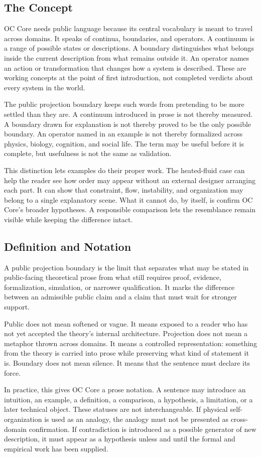 \documentclass[11pt,a4paper,openany]{book}
\begin{document}
\subsection{The Concept}
OC Core needs public language because its central vocabulary is meant to travel across domains. It speaks of continua, boundaries, and operators. A continuum is a range of possible states or descriptions. A boundary distinguishes what belongs inside the current description from what remains outside it. An operator names an action or transformation that changes how a system is described. These are working concepts at the point of first introduction, not completed verdicts about every system in the world. \cite{landau_stat_physics,prigogine_dissipative}\par
The public projection boundary keeps such words from pretending to be more settled than they are. A continuum introduced in prose is not thereby measured. A boundary drawn for explanation is not thereby proved to be the only possible boundary. An operator named in an example is not thereby formalized across physics, biology, cognition, and social life. The term may be useful before it is complete, but usefulness is not the same as validation.\par
This distinction lets examples do their proper work. The heated-fluid case can help the reader see how order may appear without an external designer arranging each part. It can show that constraint, flow, instability, and organization may belong to a single explanatory scene. What it cannot do, by itself, is confirm OC Core's broader hypotheses. A responsible comparison lets the resemblance remain visible while keeping the difference intact.\par
\subsection{Definition and Notation}
A public projection boundary is the limit that separates what may be stated in public-facing theoretical prose from what still requires proof, evidence, formalization, simulation, or narrower qualification. It marks the difference between an admissible public claim and a claim that must wait for stronger support. \cite{landau_stat_physics,prigogine_dissipative}\par
Public does not mean softened or vague. It means exposed to a reader who has not yet accepted the theory's internal architecture. Projection does not mean a metaphor thrown across domains. It means a controlled representation: something from the theory is carried into prose while preserving what kind of statement it is. Boundary does not mean silence. It means that the sentence must declare its force.\par
In practice, this gives OC Core a prose notation. A sentence may introduce an intuition, an example, a definition, a comparison, a hypothesis, a limitation, or a later technical object. These statuses are not interchangeable. If physical self-organization is used as an analogy, the analogy must not be presented as cross-domain confirmation. If contradiction is introduced as a possible generator of new description, it must appear as a hypothesis unless and until the formal and empirical work has been supplied.\par
\end{document}
